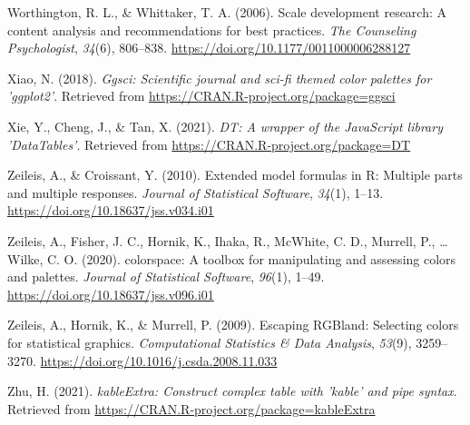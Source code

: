 \documentclass[
  man]{apa6}
\newlength{\cslhangindent}
\newlength{\cslentryspacingunit} %
\newenvironment{CSLReferences}[2] %
 {%
  \setlength{\parindent}{0pt}
  \ifodd #1
  \let\oldpar\par
  \def\par{\hangindent=\cslhangindent\oldpar}
  \fi
  \setlength{\parskip}{#2\cslentryspacingunit}
 }%
 {}
\begin{document}
\begin{CSLReferences}{1}{0}
\leavevmode{}%
Worthington, R. L., \& Whittaker, T. A. (2006). Scale development research: A content analysis and recommendations for best practices. \emph{The Counseling Psychologist}, \emph{34}(6), 806--838. \url{https://doi.org/10.1177/0011000006288127}

\leavevmode{}%
Xiao, N. (2018). \emph{Ggsci: Scientific journal and sci-fi themed color palettes for 'ggplot2'}. Retrieved from \url{https://CRAN.R-project.org/package=ggsci}

\leavevmode{}%
Xie, Y., Cheng, J., \& Tan, X. (2021). \emph{DT: A wrapper of the JavaScript library 'DataTables'}. Retrieved from \url{https://CRAN.R-project.org/package=DT}

\leavevmode{}%
Zeileis, A., \& Croissant, Y. (2010). Extended model formulas in {R}: Multiple parts and multiple responses. \emph{Journal of Statistical Software}, \emph{34}(1), 1--13. \url{https://doi.org/10.18637/jss.v034.i01}

\leavevmode{}%
Zeileis, A., Fisher, J. C., Hornik, K., Ihaka, R., McWhite, C. D., Murrell, P., \ldots{} Wilke, C. O. (2020). {colorspace}: A toolbox for manipulating and assessing colors and palettes. \emph{Journal of Statistical Software}, \emph{96}(1), 1--49. \url{https://doi.org/10.18637/jss.v096.i01}

\leavevmode{}%
Zeileis, A., Hornik, K., \& Murrell, P. (2009). Escaping {RGB}land: Selecting colors for statistical graphics. \emph{Computational Statistics \& Data Analysis}, \emph{53}(9), 3259--3270. \url{https://doi.org/10.1016/j.csda.2008.11.033}

\leavevmode{}%
Zhu, H. (2021). \emph{kableExtra: Construct complex table with 'kable' and pipe syntax}. Retrieved from \url{https://CRAN.R-project.org/package=kableExtra}

\end{CSLReferences}

\endgroup
\end{document}
